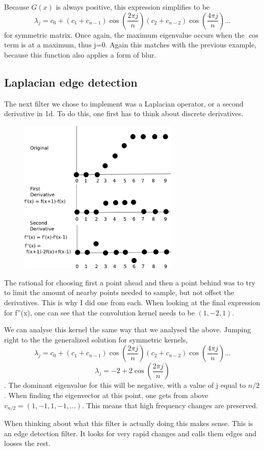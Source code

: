 \documentclass[11pt]{article}
\begin{document}
Because $G(x)$ is always positive, this expression simplifies to be $$\lambda_j = c_0+(c_{1}+c_{n-1})\cos(\dfrac{2\pi j}{n})(c_{2}+c_{n-2})\cos(\dfrac{4\pi j}{n}) ...$$ for symmetric matrix. Once again, the maximum eigenvalue occurs when the $\cos$ term is at a maximum, thus j=0. Again this matches with the previous example, because this function also applies a form of blur.   

\subsection{Laplacian edge detection}
The next filter we chose to implement was a Laplacian operator, or a second derivative in 1d. To do this, one first has to think about discrete derivatives.
\begin{figure}[htp]
\includegraphics[width=3in]{discreteLaplacian.png}
\label{}
\end{figure}
The rational for choosing first a point ahead and then a point behind was to try to limit the amount of nearby points needed to sample, but not offset the derivatives. This is why I did one from each. When looking at the final expression for f''(x), one can see that the convolution kernel needs to be $(1,-2,1)$.

We can analyse this kernel the same way that we analysed the above. Jumping right to the the generalized solution for symmetric kernels,$$\lambda_j = c_0+(c_{1}+c_{n-1})\cos(\dfrac{2\pi j}{n})(c_{2}+c_{n-2})\cos(\dfrac{4\pi j}{n}) ...$$ 
$$ \lambda_j = -2 + 2\cos(\dfrac{2\pi j}{n}) $$. The dominant eigenvalue for this will be negative, with a value of j equal to $n/2$. When finding the eigenvector at this point, one gets from above $v_{n/2} = (1,-1,1,-1, ...)$. This means that high frequency changes are preserved. 

When thinking about what this filter is actually doing this makes sense. This is an edge detection filter. It looks for very rapid changes and calls them edges and looses the rest.
\end{document}
